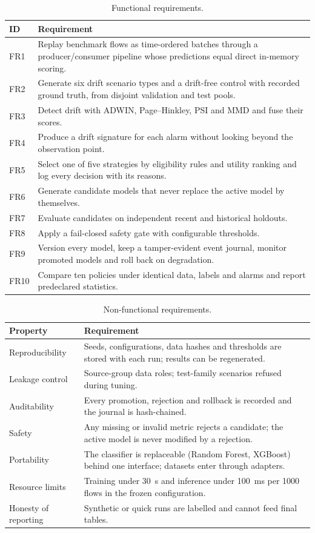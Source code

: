 \documentclass{article}
\begin{document}
\begin{table}[h]
\centering
\caption{Functional requirements.}
\label{tab:fr}
\small
\begin{tabular}{p{1cm}p{11.8cm}}
\toprule
ID & Requirement \\
\midrule
FR1 & Replay benchmark flows as time-ordered batches through a producer/consumer pipeline whose predictions equal direct in-memory scoring. \\
FR2 & Generate six drift scenario types and a drift-free control with recorded ground truth, from disjoint validation and test pools. \\
FR3 & Detect drift with ADWIN, Page--Hinkley, PSI and MMD and fuse their scores. \\
FR4 & Produce a drift signature for each alarm without looking beyond the observation point. \\
FR5 & Select one of five strategies by eligibility rules and utility ranking and log every decision with its reasons. \\
FR6 & Generate candidate models that never replace the active model by themselves. \\
FR7 & Evaluate candidates on independent recent and historical holdouts. \\
FR8 & Apply a fail-closed safety gate with configurable thresholds. \\
FR9 & Version every model, keep a tamper-evident event journal, monitor promoted models and roll back on degradation. \\
FR10 & Compare ten policies under identical data, labels and alarms and report predeclared statistics. \\
\bottomrule
\end{tabular}
\end{table}

\begin{table}[h]
\centering
\caption{Non-functional requirements.}
\label{tab:nfr}
\small
\begin{tabular}{p{3.2cm}p{9.6cm}}
\toprule
Property & Requirement \\
\midrule
Reproducibility & Seeds, configurations, data hashes and thresholds are stored with each run; results can be regenerated. \\
Leakage control & Source-group data roles; test-family scenarios refused during tuning. \\
Auditability & Every promotion, rejection and rollback is recorded and the journal is hash-chained. \\
Safety & Any missing or invalid metric rejects a candidate; the active model is never modified by a rejection. \\
Portability & The classifier is replaceable (Random Forest, XGBoost) behind one interface; datasets enter through adapters. \\
Resource limits & Training under 30~s and inference under 100~ms per 1000 flows in the frozen configuration. \\
Honesty of reporting & Synthetic or quick runs are labelled and cannot feed final tables. \\
\bottomrule
\end{tabular}
\end{table}
\end{document}
